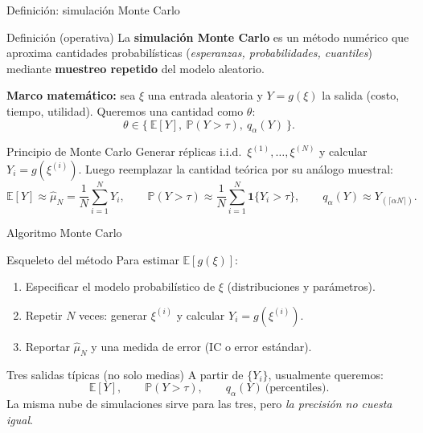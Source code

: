 \documentclass[aspectratio=1610, 9pt]{beamer}
\begin{document}
\begin{frame}{Definición: simulación Monte Carlo}
\begin{block}{Definición (operativa)}
La \textbf{simulación Monte Carlo} es un método numérico que aproxima cantidades probabilísticas
(\emph{esperanzas, probabilidades, cuantiles}) mediante \textbf{muestreo repetido} del modelo aleatorio.
\end{block}

\medskip
\textbf{Marco matemático:} sea $\xi$ una entrada aleatoria y $Y=g(\xi)$ la salida (costo, tiempo, utilidad).
Queremos una cantidad como $\theta$:
\[
\theta \in \Big\{\ \mathbb E[Y],\ \mathbb P(Y>\tau),\ q_\alpha(Y)\ \Big\}.
\]

\begin{block}{Principio de Monte Carlo}
Generar réplicas i.i.d.\ $\xi^{(1)},\dots,\xi^{(N)}$ y calcular $Y_i=g(\xi^{(i)})$.
Luego reemplazar la cantidad teórica por su análogo muestral:
\[
\mathbb E[Y]\approx \widehat\mu_N=\frac{1}{N}\sum_{i=1}^N Y_i,
\qquad
\mathbb P(Y>\tau)\approx \frac{1}{N}\sum_{i=1}^N \mathbf 1\{Y_i>\tau\},
\qquad
q_\alpha(Y)\approx Y_{(\lceil \alpha N\rceil)}.
\]
\end{block}

\end{frame}


\begin{frame}{Algoritmo Monte Carlo}
\begin{block}{Esqueleto del método}
Para estimar $\mathbb E[g(\xi)]$:
\begin{enumerate}
  \item Especificar el modelo probabilístico de $\xi$ (distribuciones y parámetros).
  \item Repetir $N$ veces: generar $\xi^{(i)}$ y calcular $Y_i=g(\xi^{(i)})$.
  \item Reportar $\widehat\mu_N$ y una medida de error (IC o error estándar).
\end{enumerate}
\end{block}

\begin{block}{Tres salidas típicas (no solo medias)}
A partir de $\{Y_i\}$, usualmente queremos:
\[
\mathbb E[Y],\qquad \mathbb P(Y>\tau),\qquad q_\alpha(Y)\ \text{(percentiles)}.
\]
La misma nube de simulaciones sirve para las tres, pero \emph{la precisión no cuesta igual}.
\end{block}
\end{frame}
\end{document}
